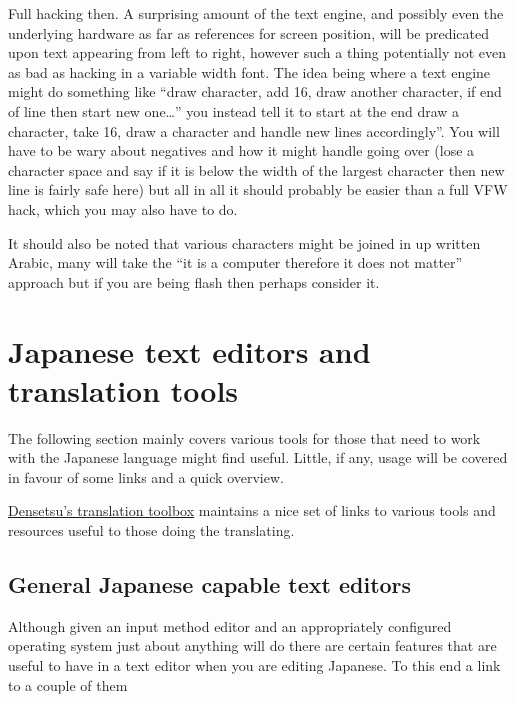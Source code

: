 \documentclass[
]{book}
\begin{document}
Full hacking then. A surprising amount of the text engine, and possibly even the underlying hardware as far as references for screen position, will be predicated upon text appearing from left to right, however such a thing potentially not even as bad as hacking in a variable width font. The idea being where a text engine might do something like ``draw character, add 16, draw another character, if end of line then start new one\ldots{}'' you instead tell it to start at the end draw a character, take 16, draw a character and handle new lines accordingly''. You will have to be wary about negatives and how it might handle going over (lose a character space and say if it is below the width of the largest character then new line is fairly safe here) but all in all it should probably be easier than a full VFW hack, which you may also have to do.

It should also be noted that various characters might be joined in up written Arabic, many will take the ``it is a computer therefore it does not matter'' approach but if you are being flash then perhaps consider it.

\hypertarget{japanese-text-editors-and-translation-tools}{%
\section{Japanese text editors and translation tools}\label{japanese-text-editors-and-translation-tools}}

The following section mainly covers various tools for those that need to work with the Japanese language might find useful. Little, if any, usage will be covered in favour of some links and a quick overview.

\href{http://gbatemp.net/topic/311523-densetsus-translation-toolbox/}{Densetsu's translation toolbox} maintains a nice set of links to various tools and resources useful to those doing the translating.

\hypertarget{general-japanese-capable-text-editors}{%
\subsection{General Japanese capable text editors}\label{general-japanese-capable-text-editors}}

Although given an input method editor and an appropriately configured operating system just about anything will do there are certain features that are useful to have in a text editor when you are editing Japanese. To this end a link to a couple of them
\end{document}
